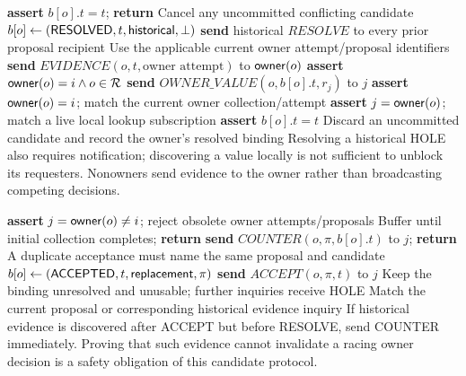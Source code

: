 \begin{algorithm}[p]
\caption{Historical evidence and owner-mediated dissemination}
\begin{algorithmic}[1]
    \State \textbf{assert} $b[o].t=t$; \textbf{return}
  \EndIf
  \State Cancel any uncommitted conflicting candidate
  \State $b[o]\gets(\mathsf{RESOLVED},t,\mathsf{historical},\bot)$
    \State \textbf{send} historical $RESOLVE$ to every prior proposal recipient
    \State Use the applicable current owner attempt/proposal identifiers
    \State {}
  \Else
    \State \textbf{send} $EVIDENCE(o,t,\text{owner attempt})$ to $\mathsf{owner}(o)$
  \EndIf
\EndProcedure
\Statex
{}
  \State \textbf{assert} $\mathsf{owner}(o)=i\land o\in\mathcal R$
    \State \textbf{send} $OWNER\_VALUE(o,b[o].t,r_j)$ to $j$
  \EndFor
\EndProcedure
\Statex
{}
  \State \textbf{assert} $\mathsf{owner}(o)=i$; match the current owner collection/attempt
  \State {}
\EndProcedure
\Statex
{}
  \State \textbf{assert} $j=\mathsf{owner}(o)$; match a live local lookup subscription
    \State \textbf{assert} $b[o].t=t$
  \Else
    \State Discard an uncommitted candidate and record the owner's resolved binding
  \EndIf
\EndProcedure
\Statex Resolving a historical HOLE also requires notification; discovering a value
\Statex locally is not sufficient to unblock its requesters. Nonowners send evidence
\Statex to the owner rather than broadcasting competing decisions.
\end{algorithmic}
\end{algorithm}

\begin{algorithm}[p]
\caption{Participant handling of a tentative candidate}
\begin{algorithmic}[1]
  \State \textbf{assert} $j=\mathsf{owner}(o)\ne i$; reject obsolete owner attempts/proposals
    \State Buffer until initial collection completes; \textbf{return}
  \EndIf
    \State \textbf{send} $COUNTER(o,\pi,b[o].t)$ to $j$; \textbf{return}
  \EndIf
  \State A duplicate acceptance must name the same proposal and candidate
  \State $b[o]\gets(\mathsf{ACCEPTED},t,\mathsf{replacement},\pi)$
  \State \textbf{send} $ACCEPT(o,\pi,t)$ to $j$
  \State Keep the binding unresolved and unusable; further inquiries receive HOLE
\EndProcedure
\Statex
{}
  \State Match the current proposal or corresponding historical evidence inquiry
  \State {}
\EndProcedure
\Statex If historical evidence is discovered after ACCEPT but before RESOLVE,
\Statex send COUNTER immediately. Proving that such evidence cannot invalidate
\Statex a racing owner decision is a safety obligation of this candidate protocol.
\end{algorithmic}
\end{algorithm}

